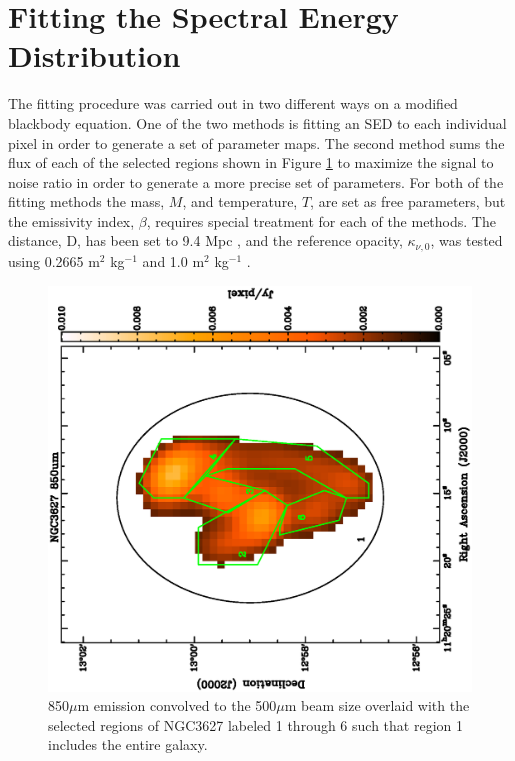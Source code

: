 \section{Fitting the Spectral Energy Distribution}

The fitting procedure was carried out in two different ways on a modified blackbody equation.  One of the two methods is fitting an SED to each individual pixel in order to generate a set of parameter maps.  The second method sums the flux of each of the selected regions shown in Figure \ref{fig:regions} to maximize the signal to noise ratio in order to generate a more precise set of parameters.  For both of the fitting methods the mass, $M$, and temperature, $T$, are set as free parameters, but the emissivity index, $\beta$, requires special treatment for each of the methods.  The distance, D, has been set to 9.4 Mpc \citep{walter2008}, and the reference opacity, $\kappa_{\nu,0}$, was tested using 0.2665 m$^2$ kg$^{-1}$ \citep{li2001} and 1.0 m$^2$ kg$^{-1}$ \citep{planckxxv2011}.

\begin{figure}
  \centering
  \includegraphics[width=1.\textwidth,angle=270]{sed_imgs/regions.eps}
  \caption[NGC3627 Regions]{850$\mu$m emission convolved to the 500$\mu$m beam size overlaid with the selected regions of NGC3627 labeled 1 through 6 such that region 1 includes the entire galaxy.}
  \label{fig:regions}
\end{figure}

